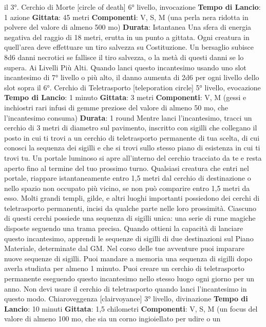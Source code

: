 \begin{multicols}{2}
il 3°.
Cerchio di Morte
[circle of death]
6° livello, invocazione
\textbf{Tempo di Lancio}: 1 azione
\textbf{Gittata}: 45 metri
\textbf{Componenti}: V, S, M (una perla nera ridotta in polvere
del valore di almeno 500 mo)
\textbf{Durata}: Istantanea
Una sfera di energia negativa del raggio di 18 metri,
erutta in un punto a gittata. Ogni creatura in quell’area
deve effettuare un tiro salvezza su Costituzione. Un
bersaglio subisce 8d6 danni necrotici se fallisce il tiro
salvezza, o la metà di questi danni se lo supera.
Ai Livelli Più Alti. Quando lanci questo incantesimo
usando uno slot incantesimo di 7° livello o più alto, il
danno aumenta di 2d6 per ogni livello dello slot sopra il
6°.
Cerchio di Teletrasporto
[teleporation circle]
5° livello, evocazione
\textbf{Tempo di Lancio}: 1 minuto
\textbf{Gittata}: 3 metri
\textbf{Componenti}: V, M (gessi e inchiostri rari infusi di
gemme preziose del valore di almeno 50 mo, che
l’incantesimo consuma)
\textbf{Durata}: 1 round
Mentre lanci l’incantesimo, tracci un cerchio di 3 metri di
diametro sul pavimento, inscritto con sigilli che
collegano il posto in cui ti trovi a un cerchio di
teletrasporto permanente di tua scelta, di cui conosci la
sequenza dei sigilli e che si trovi sullo stesso piano di
esistenza in cui ti trovi tu. Un portale luminoso si apre
all’interno del cerchio tracciato da te e resta aperto fino
al termine del tuo prossimo turno. Qualsiasi creatura
che entri nel portale, riappare istantaneamente entro
1,5 metri dal cerchio di destinazione o nello spazio non
occupato più vicino, se non può comparire entro 1,5
metri da esso.
Molti grandi templi, gilde, e altri luoghi importanti
possiedono dei cerchi di teletrasporto permanenti, incisi
da qualche parte nelle loro prossimità. Ciascuno di
questi cerchi possiede una sequenza di sigilli unica:
una serie di rune magiche disposte seguendo una
trama precisa. Quando ottieni la capacità di lanciare
questo incantesimo, apprendi le sequenze di sigilli di
due destinazioni sul Piano Materiale, determinate dal
GM. Nel corso delle tue avventure puoi imparare nuove
sequenze di sigilli. Puoi mandare a memoria una
sequenza di sigilli dopo averla studiata per almeno 1
minuto.
Puoi creare un cerchio di teletrasporto permanente
eseguendo questo incantesimo nello stesso luogo ogni
giorno per un anno. Non devi usare il cerchio di
teletrasporto quando lanci l’incantesimo in questo
modo.
Chiaroveggenza
[clairvoyance]
3° livello, divinazione
\textbf{Tempo di Lancio}: 10 minuti
\textbf{Gittata}: 1,5 chilometri
\textbf{Componenti}: V, S, M (un focus del valore di almeno
100 mo, che sia un corno ingioiellato per udire o un

\end{multicols}
